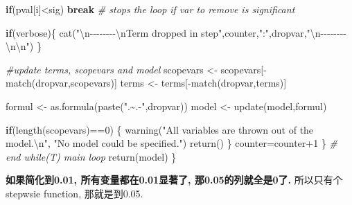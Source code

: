 \documentclass[
]{article}
\newenvironment{Shaded}{\begin{snugshade}}{\end{snugshade}}
\newcommand{\CommentTok}[1]{\textcolor[rgb]{0.56,0.35,0.01}{\textit{#1}}}
\newcommand{\ControlFlowTok}[1]{\textcolor[rgb]{0.13,0.29,0.53}{\textbf{#1}}}
\newcommand{\DecValTok}[1]{\textcolor[rgb]{0.00,0.00,0.81}{#1}}
\newcommand{\FunctionTok}[1]{\textcolor[rgb]{0.00,0.00,0.00}{#1}}
\newcommand{\NormalTok}[1]{#1}
\newcommand{\OtherTok}[1]{\textcolor[rgb]{0.56,0.35,0.01}{#1}}
\newcommand{\SpecialCharTok}[1]{\textcolor[rgb]{0.00,0.00,0.00}{#1}}
\newcommand{\StringTok}[1]{\textcolor[rgb]{0.31,0.60,0.02}{#1}}
\begin{document}
\begin{Shaded}
\begin{Highlighting}[]
    \ControlFlowTok{if}\NormalTok{(pval[i]}\SpecialCharTok{\textless{}}\NormalTok{sig) }\ControlFlowTok{break} \CommentTok{\# stops the loop if var to remove is significant}
    
    \ControlFlowTok{if}\NormalTok{(verbose)\{}
      \FunctionTok{cat}\NormalTok{(}\StringTok{"}\SpecialCharTok{\textbackslash{}n}\StringTok{{-}{-}{-}{-}{-}{-}{-}{-}}\SpecialCharTok{\textbackslash{}n}\StringTok{Term dropped in step"}\NormalTok{,counter,}\StringTok{":"}\NormalTok{,dropvar,}\StringTok{"}\SpecialCharTok{\textbackslash{}n}\StringTok{{-}{-}{-}{-}{-}{-}{-}{-}}\SpecialCharTok{\textbackslash{}n\textbackslash{}n}\StringTok{"}\NormalTok{)              }
\NormalTok{    \}}
    
    \CommentTok{\#update terms, scopevars and model}
\NormalTok{    scopevars }\OtherTok{\textless{}{-}}\NormalTok{ scopevars[}\SpecialCharTok{{-}}\FunctionTok{match}\NormalTok{(dropvar,scopevars)]}
\NormalTok{    terms }\OtherTok{\textless{}{-}}\NormalTok{ terms[}\SpecialCharTok{{-}}\FunctionTok{match}\NormalTok{(dropvar,terms)]}
    
\NormalTok{    formul }\OtherTok{\textless{}{-}} \FunctionTok{as.formula}\NormalTok{(}\FunctionTok{paste}\NormalTok{(}\StringTok{".\textasciitilde{}.{-}"}\NormalTok{,dropvar))}
\NormalTok{    model }\OtherTok{\textless{}{-}} \FunctionTok{update}\NormalTok{(model,formul)}
    
    \ControlFlowTok{if}\NormalTok{(}\FunctionTok{length}\NormalTok{(scopevars)}\SpecialCharTok{==}\DecValTok{0}\NormalTok{) \{}
      \FunctionTok{warning}\NormalTok{(}\StringTok{"All variables are thrown out of the model.}\SpecialCharTok{\textbackslash{}n}\StringTok{"}\NormalTok{,}
              \StringTok{"No model could be specified."}\NormalTok{)}
      \FunctionTok{return}\NormalTok{()}
\NormalTok{    \}}
\NormalTok{    counter}\OtherTok{=}\NormalTok{counter}\SpecialCharTok{+}\DecValTok{1}
\NormalTok{  \} }\CommentTok{\# end while(T) main loop}
  \FunctionTok{return}\NormalTok{(model)}
\NormalTok{\}}
\end{Highlighting}
\end{Shaded}

\textbf{如果简化到0.01, 所有变量都在0.01显著了, 那0.05的列就全是0了.}
所以只有个 stepwsie function, 那就是到0.05.
\end{document}
